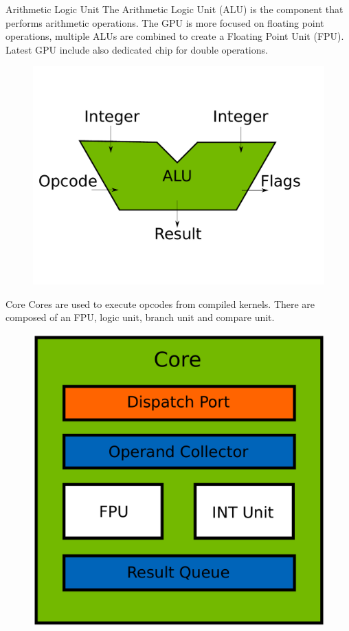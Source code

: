 \documentclass{beamer}
\begin{document}
\begin{frame}{Arithmetic Logic Unit}
	The Arithmetic Logic Unit (ALU) is the component that performs arithmetic operations. The GPU is more focused on floating point operations, multiple ALUs are combined to create a Floating Point Unit (FPU). Latest GPU include also dedicated chip for double operations.
	\begin{figure}
		\includegraphics[scale=0.3]{figures/ALU.pdf}
	\end{figure}
\end{frame}

\begin{frame}{Core}
	Cores are used to execute opcodes from compiled kernels. There are composed of an FPU, logic unit, branch unit and compare unit.
	\begin{figure}
		\includegraphics[scale=0.2]{figures/cudacore.pdf}
	\end{figure}
\end{frame}
\end{document}
